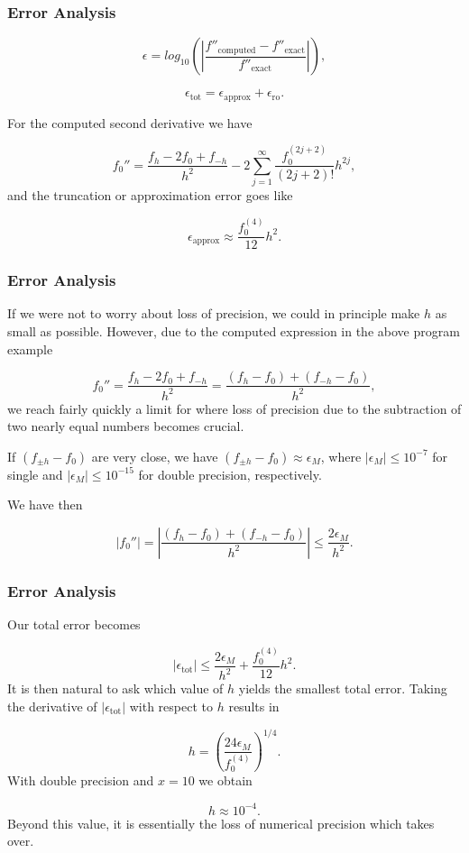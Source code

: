 \documentclass[handout]{beamer}
\newenvironment{block_mdfboxadmon}[1][]{\begin{block}{#1}}{\end{block}}
\begin{document}
\begin{frame}
\frametitle{Error Analysis}

\begin{block_mdfboxadmon}[]
\[
   \epsilon=log_{10}\left(\left|\frac{f''_{\mbox{computed}}-f''_{\mbox{exact}}}
                 {f''_{\mbox{exact}}}\right|\right),
\]

\[
   \epsilon_{\mbox{tot}}=\epsilon_{\mbox{approx}}+\epsilon_{\mbox{ro}}.
\]

For the computed second derivative  we have

\[
 f_0''=\frac{ f_h -2f_0 +f_{-h}}{h^2}-2\sum_{j=1}^{\infty}\frac{f_0^{(2j+2)}}{(2j+2)!}h^{2j},
\]
and the truncation or approximation error goes like

\[
  \epsilon_{\mbox{approx}}\approx \frac{f_0^{(4)}}{12}h^{2}.
\]
\end{block_mdfboxadmon}
\end{frame}

\begin{frame}
\frametitle{Error Analysis}

\begin{block_mdfboxadmon}[]
If we were not to worry about loss of precision, we could in principle
make $h$ as small as possible.
However, due to the computed expression in the above program example

\[
 f_0''=\frac{ f_h -2f_0 +f_{-h}}{h^2}=\frac{ (f_h -f_0) +(f_{-h}-f_0)}{h^2},
\]
we reach fairly quickly a limit for where loss of precision due to the subtraction
of two nearly equal numbers becomes crucial.

If $(f_{\pm h} -f_0)$ are very close, we have
$(f_{\pm h} -f_0)\approx \epsilon_M$, where $|\epsilon_M|\le 10^{-7}$ for single and
$|\epsilon_M|\le 10^{-15}$ for double precision, respectively.

We have then

\[
 \left|f_0''\right|=
 \left|\frac{ (f_h -f_0) +(f_{-h}-f_0)}{h^2}\right|\le \frac{ 2 \epsilon_M}{h^2}.
\]
\end{block_mdfboxadmon}
\end{frame}

\begin{frame}
\frametitle{Error Analysis}

\begin{block_mdfboxadmon}[]
Our total error becomes

\[
   \left|\epsilon_{\mbox{tot}}\right|\le  \frac{2 \epsilon_M}{h^2} +
                          \frac{f_0^{(4)}}{12}h^{2}.
    \label{eq:experror}
\]
It is then natural to ask which value of $h$ yields the smallest
total error. Taking the derivative of $\left|\epsilon_{\mbox{tot}}\right|$
with respect to $h$ results in

\[
   h= \left(\frac{ 24\epsilon_M}{f_0^{(4)}}\right)^{1/4}.
\]
With double precision and $x=10$ we obtain

\[
   h\approx 10^{-4}.
\]
Beyond this value, it is essentially the loss of numerical precision
which takes over.
\end{block_mdfboxadmon}
\end{frame}
\end{document}

